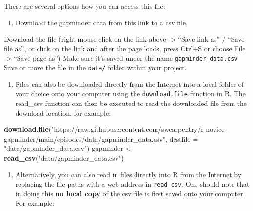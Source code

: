 \documentclass[
]{book}
\newenvironment{Shaded}{\begin{snugshade}}{\end{snugshade}}
\newcommand{\AttributeTok}[1]{\textcolor[rgb]{0.13,0.29,0.53}{#1}}
\newcommand{\FunctionTok}[1]{\textcolor[rgb]{0.13,0.29,0.53}{\textbf{#1}}}
\newcommand{\NormalTok}[1]{#1}
\newcommand{\OtherTok}[1]{\textcolor[rgb]{0.56,0.35,0.01}{#1}}
\newcommand{\StringTok}[1]{\textcolor[rgb]{0.31,0.60,0.02}{#1}}
\providecommand{\tightlist}{%
  \setlength{\itemsep}{0pt}\setlength{\parskip}{0pt}}
\begin{document}
There are several options how you can access this file:

\begin{enumerate}
\def\labelenumi{\arabic{enumi}.}
\tightlist
\item
  Download the gapminder data from \href{https://swcarpentry.github.io/r-novice-gapminder/data/gapminder_data.csv}{this link to a csv file}.
\end{enumerate}

Download the file (right mouse click on the link above -\textgreater{} ``Save link as'' / ``Save file as'', or click on the link and after the page loads, press Ctrl+S or choose File -\textgreater{} ``Save page as'')
Make sure it's saved under the name \texttt{gapminder\_data.csv}
Save or move the file in the \texttt{data/} folder within your project.

\begin{enumerate}
\def\labelenumi{\arabic{enumi}.}
\setcounter{enumi}{1}
\tightlist
\item
  Files can also be downloaded directly from the Internet into a local folder of your choice onto your computer using the \texttt{download.file} function in R. The read\_csv function can then be executed to read the downloaded file from the download location, for example:
\end{enumerate}

\begin{Shaded}
\begin{Highlighting}[]
\FunctionTok{download.file}\NormalTok{(}\StringTok{"https://raw.githubusercontent.com/swcarpentry/r{-}novice{-}gapminder/main/episodes/data/gapminder\_data.csv"}\NormalTok{, }\AttributeTok{destfile =} \StringTok{"data/gapminder\_data.csv"}\NormalTok{)}
\NormalTok{gapminder }\OtherTok{\textless{}{-}} \FunctionTok{read\_csv}\NormalTok{(}\StringTok{"data/gapminder\_data.csv"}\NormalTok{)}
\end{Highlighting}
\end{Shaded}

\begin{enumerate}
\def\labelenumi{\arabic{enumi}.}
\setcounter{enumi}{2}
\tightlist
\item
  Alternatively, you can also read in files directly into R from the Internet by replacing the file paths with a web address in \texttt{read\_csv}. One should note that in doing this \textbf{no local copy} of the csv file is first saved onto your computer. For example:
\end{enumerate}
\end{document}
